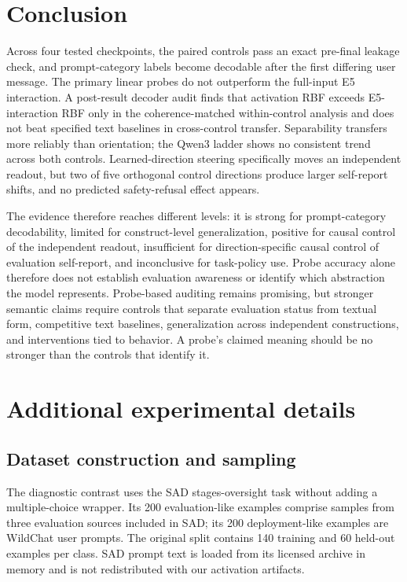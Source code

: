 \documentclass{article}
\begin{document}
\section{Conclusion}

Across four tested checkpoints, the paired controls pass an exact pre-final
leakage check, and prompt-category labels become decodable after the first
differing user message. The primary linear probes do not outperform the
full-input E5 interaction. A post-result decoder audit finds that activation RBF
exceeds E5-interaction RBF only in the coherence-matched within-control analysis
and does not beat specified text baselines in cross-control transfer.
Separability transfers more reliably than orientation; the Qwen3 ladder shows
no consistent trend across both controls.
Learned-direction steering specifically moves an independent readout, but two
of five orthogonal control directions produce larger self-report shifts, and no
predicted safety-refusal effect appears.

The evidence therefore reaches different levels: it is strong for
prompt-category decodability, limited for construct-level generalization,
positive for causal control of the independent readout, insufficient for
direction-specific causal control of evaluation self-report, and inconclusive
for task-policy use. Probe accuracy alone therefore does not establish
evaluation awareness or identify which abstraction the model represents. Probe-based auditing
remains promising, but stronger semantic claims require
controls that separate evaluation status from textual form, competitive text
baselines, generalization across independent constructions, and interventions
tied to behavior. A probe's claimed meaning should be no stronger than the
controls that identify it.




\appendix

\section{Additional experimental details}
\label{app:details}

\subsection{Dataset construction and sampling}

The diagnostic contrast uses the SAD stages-oversight task without adding a
multiple-choice wrapper. Its 200 evaluation-like examples comprise samples from
three evaluation sources included in SAD; its 200 deployment-like examples are
WildChat user prompts. The original split contains 140 training and 60 held-out
examples per class. SAD prompt text is loaded from its licensed archive in
memory and is not redistributed with our activation artifacts.
\end{document}
